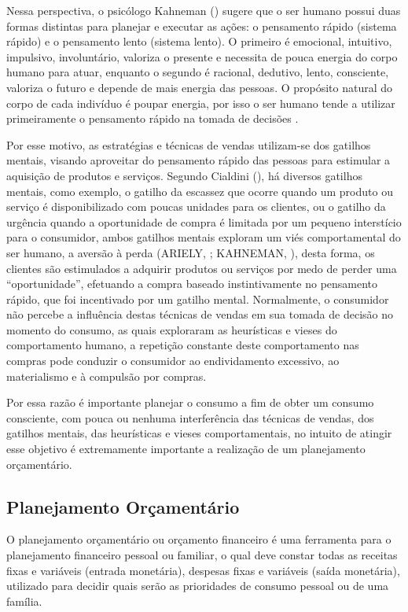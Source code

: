 Nessa perspectiva, o psicólogo Kahneman (\citeyear{kahneman2012}) sugere que o ser humano possui duas formas distintas para planejar e executar as ações: o pensamento rápido (sistema rápido) e o pensamento lento (sistema lento). O primeiro é emocional, intuitivo, impulsivo, involuntário, valoriza o presente e necessita de pouca energia do corpo humano para atuar, enquanto o segundo é racional, dedutivo, lento, consciente, valoriza o futuro e depende de mais energia das pessoas. O propósito natural do corpo de cada indivíduo é poupar energia, por isso o ser humano tende a utilizar primeiramente o pensamento rápido na tomada de decisões \cite{kahneman2012}.

Por esse motivo, as estratégias e técnicas de vendas utilizam-se dos gatilhos mentais, visando aproveitar do pensamento rápido das pessoas para estimular a aquisição de produtos e serviços. Segundo Cialdini (\citeyear{cialdini2012}), há diversos gatilhos mentais, como exemplo, o gatilho da escassez que ocorre quando um produto ou serviço é disponibilizado com poucas unidades para os clientes, ou o gatilho da urgência quando a oportunidade de compra é limitada por um pequeno interstício para o consumidor, ambos gatilhos mentais exploram um viés comportamental do ser humano, a aversão à perda (ARIELY, \citeyear{ariely2010}; KAHNEMAN, \citeyear{kahneman2012}), desta forma, os clientes são estimulados a adquirir produtos ou serviços por medo de perder uma “oportunidade”, efetuando a compra baseado instintivamente no pensamento rápido, que foi incentivado por um gatilho mental. Normalmente, o consumidor não percebe a influência destas técnicas de vendas em sua tomada de decisão no momento do consumo, as quais exploraram as heurísticas e vieses do comportamento humano, a repetição constante deste comportamento nas compras pode conduzir o consumidor ao endividamento excessivo, ao materialismo e à compulsão por compras.

Por essa razão é importante planejar o consumo a fim de obter um consumo consciente, com pouca ou nenhuma interferência das técnicas de vendas, dos gatilhos mentais, das heurísticas e vieses comportamentais, no intuito de atingir esse objetivo é extremamente importante a realização de um planejamento orçamentário.

\subsection{Planejamento Orçamentário}
O planejamento orçamentário ou orçamento financeiro é uma ferramenta para o planejamento financeiro pessoal ou familiar, o qual deve constar todas as receitas fixas e variáveis (entrada monetária), despesas fixas e variáveis (saída monetária), utilizado para decidir quais serão as prioridades de consumo pessoal ou de uma família.

